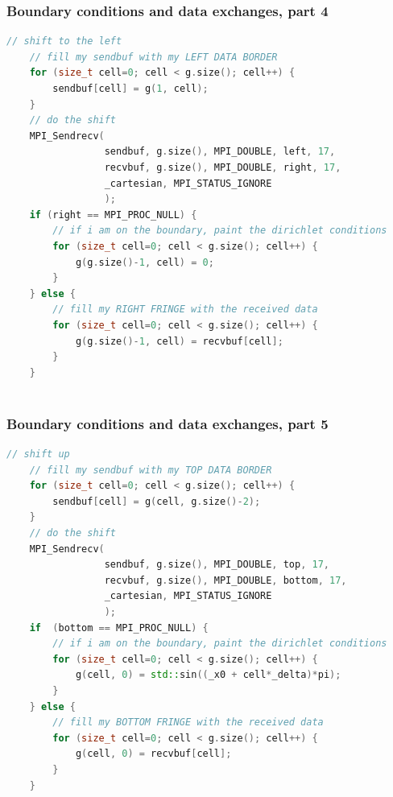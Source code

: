 \begin{frame}[fragile]
%
  \frametitle{Boundary conditions and data exchanges, part 4}
%
  \begin{lstlisting}[language=c++,name=mpi:example-impl]
    // shift to the left
    // fill my sendbuf with my LEFT DATA BORDER
    for (size_t cell=0; cell < g.size(); cell++) {
        sendbuf[cell] = g(1, cell);
    }
    // do the shift 
    MPI_Sendrecv(
                 sendbuf, g.size(), MPI_DOUBLE, left, 17,
                 recvbuf, g.size(), MPI_DOUBLE, right, 17,
                 _cartesian, MPI_STATUS_IGNORE
                 );
    if (right == MPI_PROC_NULL) {
        // if i am on the boundary, paint the dirichlet conditions
        for (size_t cell=0; cell < g.size(); cell++) {
            g(g.size()-1, cell) = 0;
        }
    } else {
        // fill my RIGHT FRINGE with the received data
        for (size_t cell=0; cell < g.size(); cell++) {
            g(g.size()-1, cell) = recvbuf[cell];
        }
    }
    
  \end{lstlisting}
% 
\end{frame}

\begin{frame}[fragile]
%
  \frametitle{Boundary conditions and data exchanges, part 5}
%
  \begin{lstlisting}[language=c++,name=mpi:example-impl]
    // shift up
    // fill my sendbuf with my TOP DATA BORDER
    for (size_t cell=0; cell < g.size(); cell++) {
        sendbuf[cell] = g(cell, g.size()-2);
    }
    // do the shift
    MPI_Sendrecv(
                 sendbuf, g.size(), MPI_DOUBLE, top, 17,
                 recvbuf, g.size(), MPI_DOUBLE, bottom, 17,
                 _cartesian, MPI_STATUS_IGNORE
                 );
    if  (bottom == MPI_PROC_NULL) {
        // if i am on the boundary, paint the dirichlet conditions
        for (size_t cell=0; cell < g.size(); cell++) {
            g(cell, 0) = std::sin((_x0 + cell*_delta)*pi);
        }
    } else {
        // fill my BOTTOM FRINGE with the received data
        for (size_t cell=0; cell < g.size(); cell++) {
            g(cell, 0) = recvbuf[cell];
        }
    }
  \end{lstlisting}
% 
\end{frame}

